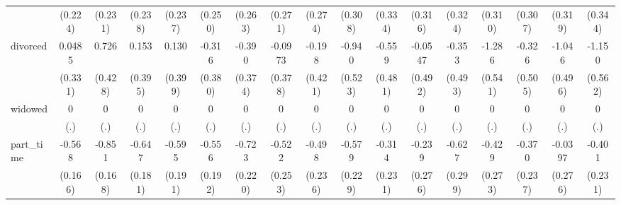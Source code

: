 {\begin{tabular}{l*{16}{c}}
                    &     (0.224)         &     (0.231)         &     (0.238)         &     (0.237)         &     (0.250)         &     (0.263)         &     (0.271)         &     (0.274)         &     (0.308)         &     (0.334)         &     (0.316)         &     (0.324)         &     (0.310)         &     (0.307)         &     (0.319)         &     (0.344)         \\
[1em]
divorced            &      0.0485         &       0.726         &       0.153         &       0.130         &      -0.316         &      -0.390         &     -0.0973         &      -0.198         &      -0.940         &      -0.559         &     -0.0547         &      -0.353         &      -1.286\sym{*}  &      -0.326         &      -1.046\sym{*}  &      -1.150\sym{*}  \\
                    &     (0.331)         &     (0.428)         &     (0.395)         &     (0.399)         &     (0.380)         &     (0.374)         &     (0.378)         &     (0.421)         &     (0.523)         &     (0.481)         &     (0.492)         &     (0.493)         &     (0.541)         &     (0.505)         &     (0.496)         &     (0.562)         \\
[1em]
widowed             &           0         &           0         &           0         &           0         &           0         &           0         &           0         &           0         &           0         &           0         &           0         &           0         &           0         &           0         &           0         &           0         \\
                    &         (.)         &         (.)         &         (.)         &         (.)         &         (.)         &         (.)         &         (.)         &         (.)         &         (.)         &         (.)         &         (.)         &         (.)         &         (.)         &         (.)         &         (.)         &         (.)         \\
[1em]
part\_time           &      -0.568\sym{***}&      -0.851\sym{***}&      -0.647\sym{***}&      -0.595\sym{**} &      -0.556\sym{**} &      -0.723\sym{**} &      -0.522\sym{*}  &      -0.498\sym{*}  &      -0.579\sym{*}  &      -0.314         &      -0.239         &      -0.627\sym{*}  &      -0.429         &      -0.370         &     -0.0397         &      -0.401         \\
                    &     (0.166)         &     (0.168)         &     (0.181)         &     (0.191)         &     (0.192)         &     (0.220)         &     (0.253)         &     (0.236)         &     (0.229)         &     (0.231)         &     (0.276)         &     (0.299)         &     (0.273)         &     (0.237)         &     (0.276)         &     (0.231)         \\

\end{tabular}}
